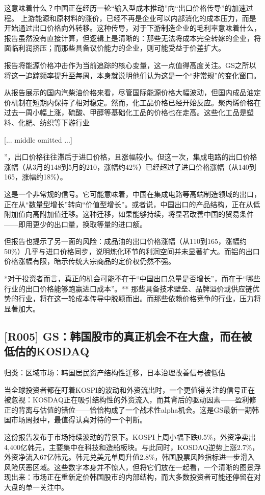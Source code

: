 \documentclass[11pt]{ctexart}
\begin{document}
这意味着什么？中国正在经历一轮“输入型成本推动”向“出口价格传导”的加速过程。 上游能源和原材料的涨价，已经不再是企业可以内部消化的成本压力，而是开始通过出口价格向外转移。这种传导，对于下游制造企业的毛利率意味着什么，报告虽然没有直接计算，但逻辑上是清晰的：那些无法将成本完全转嫁的企业，将面临利润挤压；而那些具备议价能力的企业，则可能受益于价差扩大。

报告将能源价格冲击作为当前追踪的核心变量，这一点值得高度关注。GS之所以将这一追踪频率提升至每周，本身就说明他们认为这是一个“非常规”的变化窗口。

从报告展示的国内汽柴油价格来看，尽管国际能源价格大幅波动，但国内成品油定价机制在短期内保持了相对稳定。然而，化工品价格已经开始反应。聚丙烯价格在过去一周小幅上涨，硫酸、甲醇等基础化工品的价格也在走高。这些化工品是塑料、化肥、纺织等下游行业

[... middle omitted ...]

”，出口价格往往滞后于进口价格，且涨幅较小。但这一次，集成电路的出口价格涨幅（从3月的148到5月的210，涨幅约42\%）已经超过了进口价格涨幅（从140到165，涨幅约18\%）。

这是一个非常规的信号。它可能意味着，中国在集成电路等高端制造领域的出口，正在从“数量型增长”转向“价值型增长”。或者说，中国出口的产品结构，正在从低附加值向高附加值迁移。这种迁移，如果能够持续，将显著改善中国的贸易条件——即用更少的出口量，换取等量的进口额。

但报告也提示了另一面的风险：成品油的出口价格涨幅（从110到165，涨幅约50\%）几乎与进口价格同步，说明炼化环节的利润空间并未显著扩大。而铝的出口价格涨幅有限，暗示传统大宗商品的定价权仍然不强。

*对于投资者而言，真正的机会可能不在于“中国出口总量是否增长”，而在于“哪些行业的出口价格能够跑赢进口成本”。** 那些具备技术壁垒、品牌溢价或供应链优势的行业，将在这一轮成本传导中脱颖而出。而那些依赖价格竞争的行业，压力将显著加大。

\subsection{[R005] GS：韩国股市的真正机会不在大盘，而在被低估的KOSDAQ}
{\small\color{refgray}归类：区域市场：韩国居民资产结构性迁移，日本治理改善信号被低估}

当全球投资者都在盯着KOSPI的波动和外资流出时，一个更值得关注的信号正在被忽视：KOSDAQ正在吸引结构性的外资流入，而其背后的驱动因素——盈利修正的背离与估值的错位——恰恰构成了一个战术性alpha机会。这是GS最新一期韩国市场周报中，最值得认真对待的一个判断。

这份报告发布于市场持续波动的背景下。KOSPI上周小幅下跌0.5\%，外资净卖出4,400亿韩元，主要集中在科技和造船板块。与此同时，KOSDAQ逆势上涨2.7\%，外资净流入67亿韩元。韩元兑美元单周升值2.8\%，韩国股票风险指标进一步滑入风险厌恶区域。这些数字本身并不惊人，但将它们放在一起看，一个清晰的图景浮现出来：市场正在重新定价韩国股市的内部结构，而大多数投资者可能还停留在对大盘的单一关注中。
\end{document}
